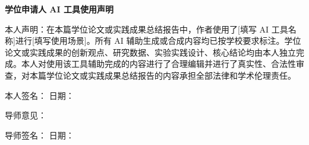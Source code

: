 \begin{titlepage}
\vspace*{-8pt}

\begin{center}
\heiti\textbf{学位申请人 AI 工具使用声明}
\end{center}

\vspace{28pt}

{
\STZhongsong
\setlength{\baselineskip}{28pt}
\par 本人声明：在本篇学位论文或实践成果总结报告中，作者使用了[填写 AI 工具名称]进行[填写使用场景]。所有 AI 辅助生成或合成内容均已按学校要求标注。学位论文或实践成果的创新观点、研究数据、实验实践设计、核心结论均由本人独立完成。本人对使用该工具辅助完成的内容进行了合理编辑并进行了真实性、合法性审查，对本篇学位论文或实践成果总结报告的内容承担全部法律和学术伦理责任。\par
}

\vspace{28pt}
\par {\STZhongsong 本人签名：\makebox[45mm]{} 日期：\makebox[30mm]{}}

\vspace{56pt}
\par {\STZhongsong 导师意见：}

\vspace{56pt}
\par {\STZhongsong 导师签名：\makebox[45mm]{} 日期：\makebox[30mm]{}}
\end{titlepage}
